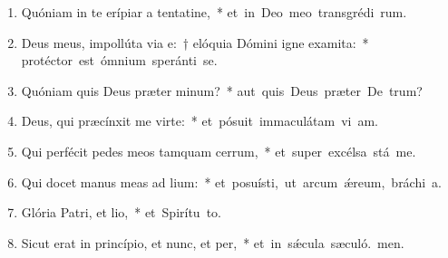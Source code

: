 \begin{flushleft}
\begin{enumerate}[leftmargin=*]
\item Quóniam in te erípiar a tentatine,~* \mbox{et in Deo meo transgrédi rum.}

\item Deus meus, impollúta via e:~† elóquia Dómini igne examita:~* \mbox{protéctor est ómnium speránti  se.}

\item Quóniam quis Deus præter minum?~* \mbox{aut quis Deus præter De trum?}

\item Deus, qui præcínxit me virte:~* \mbox{et pósuit immaculátam vi am.}

\item Qui perfécit pedes meos tamquam cerrum,~* \mbox{et super excélsa stá me.}

\item Qui docet manus meas ad lium:~* \mbox{et posuísti, ut arcum ǽreum, bráchi a.}


\item Glória Patri, et lio,~* \mbox{et Spirítu to.}

\item Sicut erat in princípio, et nunc, et per,~* \mbox{et in sǽcula sæculó. men.}

\end{enumerate}
\end{flushleft}

